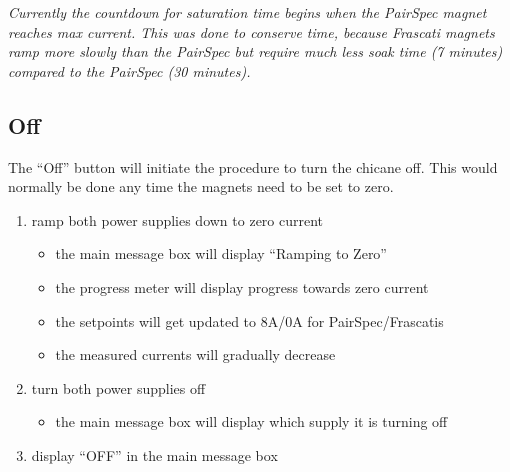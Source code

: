 \documentclass[amsmath,amssymb,notitlepage,11pt]{revtex4-1}
\begin{document}
{\em Currently the countdown for saturation time begins when the PairSpec magnet reaches max current.  This was done to conserve time, because Frascati magnets ramp more slowly than the PairSpec but require much less soak time (7 minutes) compared to the PairSpec (30 minutes).}
\subsection{Off}
The ``Off'' button will initiate the procedure to turn the chicane off.  This would normally be done any time the magnets need to be set to zero.
\begin{enumerate}
    \item ramp both power supplies down to zero current
    \begin{itemize}
    \item the main message box will display ``Ramping to Zero''
    \item the progress meter will display progress towards zero current
    \item the setpoints will get updated to 8A/0A for PairSpec/Frascatis
    \item the measured currents will gradually decrease
    \end{itemize}
    \item turn both power supplies off
    \begin{itemize}
    \item the main message box will display which supply it is turning off
    \end{itemize}
    \item display ``OFF'' in the main message box
\end{enumerate}

\newpage
\end{document}
